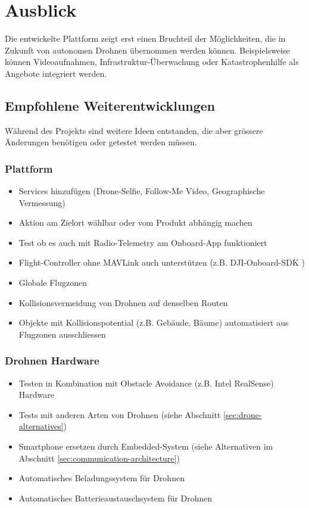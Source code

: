 \section{Ausblick}

Die entwickelte Plattform zeigt erst einen Bruchteil der Möglichkeiten, die in Zukunft von autonomen Drohnen übernommen werden können. Beispielsweise können Videoaufnahmen, Infrastruktur-Überwachung oder Katastrophenhilfe als Angebote integriert werden. 

\subsection{Empfohlene Weiterentwicklungen}

Während des Projekts sind weitere Ideen entstanden, die aber grössere Änderungen benötigen oder getestet werden müssen. 

\subsubsection{Plattform}

\begin{itemize}
	\item Services hinzufügen (Drone-Selfie, Follow-Me Video, Geographische Vermessung)
	\item Aktion am Zielort wählbar oder vom Produkt abhängig machen
	\item Test ob es auch mit Radio-Telemetry am Onboard-App funktioniert
	\item \Gls{Flight-Controller} ohne \Gls{MAVLink} auch unterstützen (z.B. DJI-Onboard-SDK \cite{dji-sdk})
	\item Globale Flugzonen
	\item Kollisionsvermeidung von Drohnen auf denselben Routen
	\item Objekte mit Kollisionspotential (z.B. Gebäude, Bäume) automatisiert aus Flugzonen ausschliessen
\end{itemize}

\subsubsection{Drohnen Hardware} 
\begin{itemize}
	\item Testen in Kombination mit Obstacle Avoidance (z.B. Intel RealSense\cite{realsense}) Hardware
		\item Tests mit anderen Arten von Drohnen (siehe Abschnitt \ref{sec:drone-alternatives})
	\item Smartphone ersetzen durch Embedded-System (siehe Alternativen im Abschnitt \ref{sec:communication-architecture}) 

	\item Automatisches Beladungssystem für Drohnen
	\item Automatisches Batterieaustauschsystem für Drohnen
\end{itemize}  



